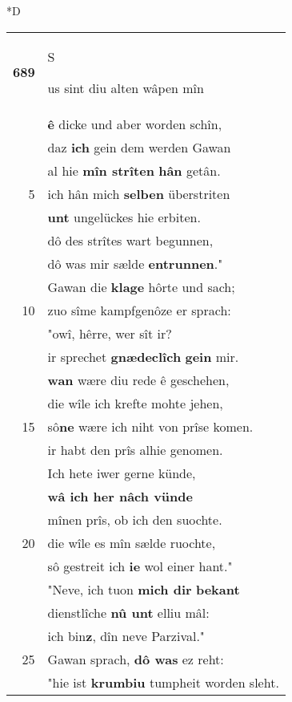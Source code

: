 \documentclass[8pt,a4paper,notitlepage]{article}
\begin{document}
\begin{table}[ht]
\begin{minipage}[t]{0.5\linewidth}
\small
\begin{center}*D
\end{center}
\begin{tabular}{rl}
\textbf{689} & \begin{large}S\end{large}us sint diu alten wâpen mîn\\ 
 & \textbf{ê} dicke und aber worden schîn,\\ 
 & daz \textbf{ich} gein dem werden Gawan\\ 
 & al hie \textbf{mîn strîten} \textbf{hân} getân.\\ 
5 & ich hân mich \textbf{selben} überstriten\\ 
 & \textbf{unt} ungelückes hie erbiten.\\ 
 & dô des strîtes wart begunnen,\\ 
 & dô was mir sælde \textbf{entrunnen}."\\ 
 & Gawan die \textbf{klage} hôrte und sach;\\ 
10 & zuo sîme kampfgenôze er sprach:\\ 
 & "owî, hêrre, wer sît ir?\\ 
 & ir sprechet \textbf{gnædeclîch} \textbf{gein} mir.\\ 
 & \textbf{wan} wære diu rede ê geschehen,\\ 
 & die wîle ich krefte mohte jehen,\\ 
15 & sô\textbf{ne} wære ich niht von prîse komen.\\ 
 & ir habt den prîs alhie genomen.\\ 
 & Ich hete iwer gerne künde,\\ 
 & \textbf{wâ ich her nâch vünde}\\ 
 & mînen prîs, ob ich den suochte.\\ 
20 & die wîle es mîn sælde ruochte,\\ 
 & sô gestreit ich \textbf{ie} wol einer hant."\\ 
 & "Neve, ich tuon \textbf{mich dir} \textbf{bekant}\\ 
 & dienstlîche \textbf{nû unt} elliu mâl:\\ 
 & ich bin\textbf{z}, dîn neve Parzival."\\ 
25 & Gawan sprach, \textbf{dô was} ez reht:\\ 
 & "hie ist \textbf{krumbiu} tumpheit worden sleht.\\ 

\end{tabular}
\end{minipage}
\end{table}
\end{document}
